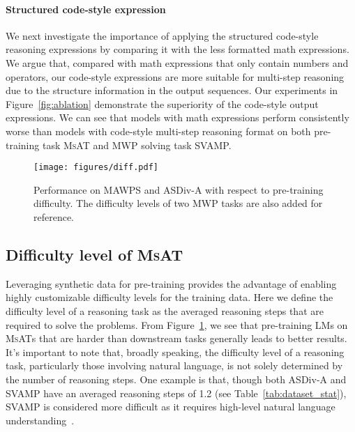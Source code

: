 \documentclass[11pt]{article}
\begin{document}
    
\paragraph{Structured code-style expression}
We next investigate the importance of applying the structured code-style reasoning expressions
        by comparing it with the less formatted math expressions.
We argue that, compared with math expressions that only contain numbers and operators,
        our code-style expressions are more suitable for multi-step reasoning due to the structure information in the output sequences.
Our experiments in Figure~\ref{fig:ablation} demonstrate the superiority of the code-style output expressions.
We can see that 
        models with math expressions perform consistently worse than models with code-style multi-step reasoning format
        on both pre-training task \textsc{MsAT} and MWP solving task SVAMP.
      



\begin{figure}[t]
    \captionsetup{type=figure}
    \centering
    \texttt{[image: figures/diff.pdf]}
    \vspace{-4pt}
    \caption{
        \label{fig:diff} 
        Performance on MAWPS and ASDiv-A with respect to pre-training difficulty.
The difficulty levels of two MWP tasks are also added for reference.
    }
    \vspace{-5pt}
\end{figure}

    
    \subsection{Difficulty level of \textsc{MsAT}}

Leveraging synthetic data for pre-training 
        provides the advantage of enabling highly customizable difficulty levels for the training data.
Here we define the difficulty level of a reasoning task as the averaged reasoning steps that are required to solve the problems.
From Figure~\ref{fig:diff}, we see that pre-training LMs on \textsc{MsAT}s that are harder than downstream tasks generally leads to better results.
It's important to note that, broadly speaking, 
        the difficulty level of a reasoning task, 
        particularly those involving natural language, 
        is not solely determined by the number of reasoning steps.
One example is that, though both ASDiv-A and SVAMP have an averaged reasoning steps of 1.2 (see Table~\ref{tab:dataset_stat}),
        SVAMP is considered more difficult as it requires high-level natural language understanding~\cite{patel2021svamp}.
\end{document}
